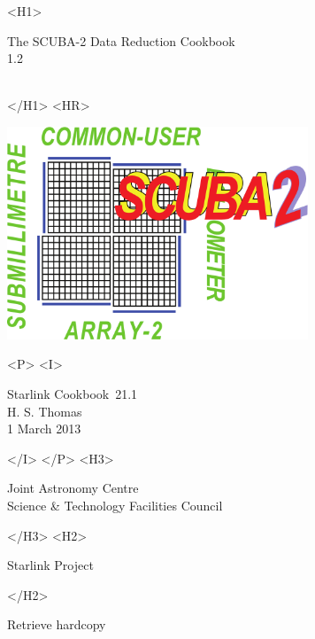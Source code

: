\documentclass[twoside,11pt]{article}
\newcommand{\stardoccategory} {Starlink Cookbook}
\newcommand{\stardocsource} {sc\stardocnumber}
\newcommand{\stardocnumber} {21.1}
\newcommand{\stardocauthors} {H. S. Thomas}
\newcommand{\stardocdate} {1 March 2013}
\newcommand{\stardoctitle} {The SCUBA-2 Data Reduction Cookbook}
\newcommand{\stardocversion} {1.2}
\newcommand{\stardocmanual} {\ }
\newcommand{\htmladdnormallink}[2]{#1}
\newcommand{\htmladdimg}[1]{}
\newcommand{\xlabel}[1]{}
\renewcommand{\_}{\texttt{\symbol{95}}}
\begin{document}
\begin{htmlonly}
   \xlabel{}
   \begin{rawhtml} <H1> \end{rawhtml}
      \stardoctitle\\
      \stardocversion\\
      \stardocmanual
   \begin{rawhtml} </H1> <HR> \end{rawhtml}

   \includegraphics[width=90mm]{sc21_s2logo}

   \begin{rawhtml} <P> <I> \end{rawhtml}
   \stardoccategory\ \stardocnumber \\
   \stardocauthors \\
   \stardocdate
   \begin{rawhtml} </I> </P> <H3> \end{rawhtml}
      \htmladdnormallink{Joint Astronomy Centre}
                        {http://www.jach.hawaii.edu}\\
      \htmladdnormallink{Science \& Technology Facilities Council}
                        {http://www.scitech.ac.uk} \\
   \begin{rawhtml} </H3> <H2> \end{rawhtml}
      \htmladdnormallink{Starlink Project}{http://www.starlink.ac.uk/}
   \begin{rawhtml} </H2> \end{rawhtml}
   \htmladdnormallink{\htmladdimg{source.gif} Retrieve hardcopy}
      {http://www.starlink.ac.uk/cgi-bin/hcserver?\stardocsource}\\


\end{htmlonly}
\end{document}
